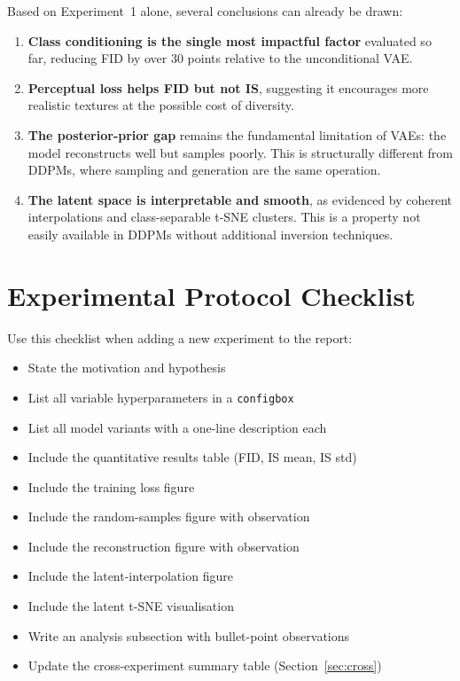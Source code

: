 \documentclass[12pt, a4paper]{article}
\begin{document}
Based on Experiment~1 alone, several conclusions can already be drawn:

\begin{enumerate}
    \item \textbf{Class conditioning is the single most impactful
          factor} evaluated so far, reducing FID by over 30 points
          relative to the unconditional VAE.

    \item \textbf{Perceptual loss helps FID but not IS}, suggesting
          it encourages more realistic textures at the possible cost of
          diversity.

    \item \textbf{The posterior-prior gap} remains the fundamental
          limitation of VAEs: the model reconstructs well but samples
          poorly. This is structurally different from DDPMs, where
          sampling and generation are the same operation.

    \item \textbf{The latent space is interpretable and smooth}, as
          evidenced by coherent interpolations and class-separable
          t-SNE clusters. This is a property not easily available in
          DDPMs without additional inversion techniques.
\end{enumerate}

\appendix

\section{Experimental Protocol Checklist}
\label{app:checklist}

Use this checklist when adding a new experiment to the report:

\begin{itemize}[label=$\square$]
    \item State the motivation and hypothesis
    \item List all variable hyperparameters in a \texttt{configbox}
    \item List all model variants with a one-line description each
    \item Include the quantitative results table (FID, IS mean, IS std)
    \item Include the training loss figure
    \item Include the random-samples figure with observation
    \item Include the reconstruction figure with observation
    \item Include the latent-interpolation figure
    \item Include the latent t-SNE visualisation
    \item Write an analysis subsection with bullet-point observations
    \item Update the cross-experiment summary table (Section~\ref{sec:cross})
\end{itemize}
\end{document}
